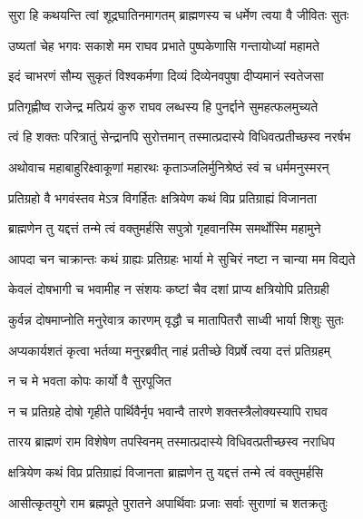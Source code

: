 \twolineshloka
{सुरा हि कथयन्ति त्वां शूद्रघातिनमागतम्}
{ब्राह्मणस्य च धर्मेण त्वया वै जीवितः सुतः}%

\twolineshloka
{उष्यतां चेह भगवः सकाशे मम राघव}
{प्रभाते पुष्पकेणासि गन्तायोध्यां महामते}%

\twolineshloka
{इदं चाभरणं सौम्य सुकृतं विश्वकर्मणा}
{दिव्यं दिव्येनवपुषा दीप्यमानं स्वतेजसा}%

\twolineshloka
{प्रतिगृह्णीष्व राजेन्द्र मत्प्रियं कुरु राघव}
{लब्धस्य हि पुनर्द्दाने सुमहत्फलमुच्यते}%

\twolineshloka
{त्वं हि शक्तः परित्रातुं सेन्द्रानपि सुरोत्तमान्}
{तस्मात्प्रदास्ये विधिवत्प्रतीच्छस्व नरर्षभ}%

\twolineshloka
{अथोवाच महाबाहुरिक्ष्वाकूणां महारथः}
{कृताञ्जलिर्मुनिश्रेष्ठं स्वं च धर्ममनुस्मरन्}%

\twolineshloka
{प्रतिग्रहो वै भगवंस्तव मेऽत्र विगर्हितः}
{क्षत्रियेण कथं विप्र प्रतिग्राह्यं विजानता}%

\twolineshloka
{ब्राह्मणेन तु यद्दत्तं तन्मे त्वं वक्तुमर्हसि}
{सपुत्रो गृहवानस्मि समर्थोस्मि महामुने}%

\twolineshloka
{आपदा चन चाक्रान्तः कथं ग्राह्यः प्रतिग्रहः}
{भार्या मे सुचिरं नष्टा न चान्या मम विद्यते}%

\twolineshloka
{केवलं दोषभागी च भवामीह न संशयः}
{कष्टां चैव दशां प्राप्य क्षत्रियोपि प्रतिग्रही}%

\twolineshloka
{कुर्वन्न दोषमाप्नोति मनुरेवात्र कारणम्}
{वृद्धौ च मातापितरौ साध्वी भार्या शिशुः सुतः}%

\twolineshloka
{अप्यकार्यशतं कृत्वा भर्तव्या मनुरब्रवीत्}
{नाहं प्रतीच्छे विप्रर्षे त्वया दत्तं प्रतिग्रहम्}%

\onelineshloka
{न च मे भवता कोपः कार्यो वै सुरपूजित}%


\twolineshloka
{न च प्रतिग्रहे दोषो गृहीते पार्थिवैर्नृप}
{भवान्वै तारणे शक्तस्त्रैलोक्यस्यापि राघव}%

\twolineshloka
{तारय ब्राह्मणं राम विशेषेण तपस्विनम्}
{तस्मात्प्रदास्ये विधिवत्प्रतीच्छस्व नराधिप}%


\twolineshloka
{क्षत्रियेण कथं विप्र प्रतिग्राह्यं विजानता}
{ब्राह्मणेन तु यद्दत्तं तन्मे त्वं वक्तुमर्हसि}%


\twolineshloka
{आसीत्कृतयुगे राम ब्रह्मपूते पुरातने}
{अपार्थिवाः प्रजाः सर्वाः सुराणां च शतक्रतुः}%

